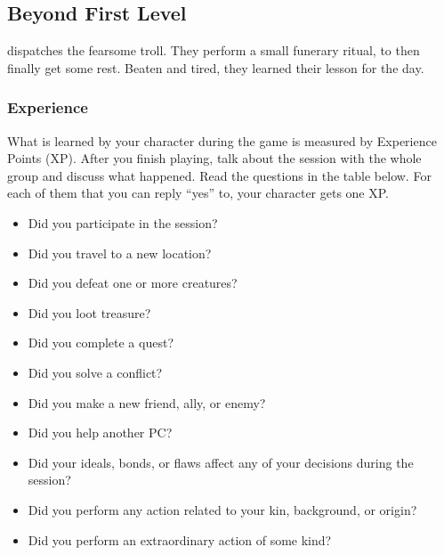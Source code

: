 \subsection*{Beyond First Level} \label{ssec::beyondfirstlevel}
dispatches the fearsome troll.
They perform a small funerary ritual, to then finally get some rest.
Beaten and tired, they learned their lesson for the day.


\thispagestyle{empty}

\subsubsection{Experience}
    What is learned by your character during the game is measured by Experience Points (XP).
    After you finish playing, talk about the session with the whole group and discuss what happened.
    Read the questions in the table below.
    For each of them that you can reply ``yes'' to, your character gets one XP.

    \begin{itemize}
        \item Did you participate in the session?
        \item Did you travel to a new location?
        \item Did you defeat one or more creatures?
        \item Did you loot treasure?
        \item Did you complete a quest?
        \item Did you solve a conflict?
        \item Did you make a new friend, ally, or enemy?
        \item Did you help another PC?
        \item Did your ideals, bonds, or flaws affect any of your decisions during the session?
        \item Did you perform any action related to your kin, background, or origin?
        \item Did you perform an extraordinary action of some kind?
    \end{itemize}

